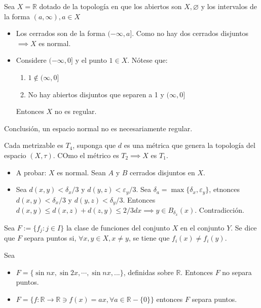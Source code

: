 \begin{ejemplo}
    Sea $X=\mathbb{R}$ dotado de la topología en que los abiertos son $X,\varnothing$ y los intervalos de la forma $(a,\infty),a\in X$
    \begin{itemize}
        \item Los cerrados son de la forma $(-\infty,a]$. Como no hay dos cerrados disjuntos $\implies X$ es normal. 
        \item Considere $(-\infty,0]$ y el punto $1\in X$. Nótese que: 
        \begin{enumerate}
            \item $1\not\in (\infty,0]$
            \item No hay abiertos disjuntos que separen a 1 y $(\infty,0]$
        \end{enumerate}
        Entonces $X$ no es regular.  
    \end{itemize}
    Conclusión, un espacio normal no es necesariamente regular. 
\end{ejemplo}


\begin{ejemplo}
    Cada metrizable es $T_4$, suponga que $d$ es una métrica que genera la topología del espacio $(X,\tau)$. COmo el métrico es $T_2\implies X$ es $T_1$. \begin{itemize}
        \item A probar: $X$ es normal. Sean $A$ y $B$ cerrados disjuntos en $X$. 
        \item Sea $d(x,y)<\delta_x/3$ y $d(y,z)<\varepsilon_y/3$. Sea $\delta_a=\max\{\delta_x,\varepsilon_y\}$, etnonces $d(x,y)<\delta_x/3$ y $d(y,z)<\delta_y/3$. Entonces $d(x,y)\leq d(x,z)+d(z,y)\leq 2/3 dx\implies y\in B_{\delta_x}(x)$. Contradicción. 
    \end{itemize}
\end{ejemplo}

\begin{definicion}
    Sea $F:= \{f_j: j\in I\}$ la clase  de funciones del conjunto $X$ en el conjunto $Y$. Se dice que $F$ separa puntos si, $\forall x,y\in X,x\neq y$, se tiene que $f_i(x)\neq f_i(y)$. 
\end{definicion}

\begin{ejemplo}
    Sea 
    \begin{itemize}
        \item $F=\{\sin nx, \sin 2x,\cdots, \sin nx, ...\}$, definidas sobre $\mathbb{R}$. Entonces $F$ no separa puntos. 
        \item $F=\{f:\mathbb{R}\to \mathbb{R}\ni f(x)=ax, \forall a\in \mathbb{R}-\{0\}\}$ entonces $F$ separa puntos. 
    \end{itemize}
\end{ejemplo}


